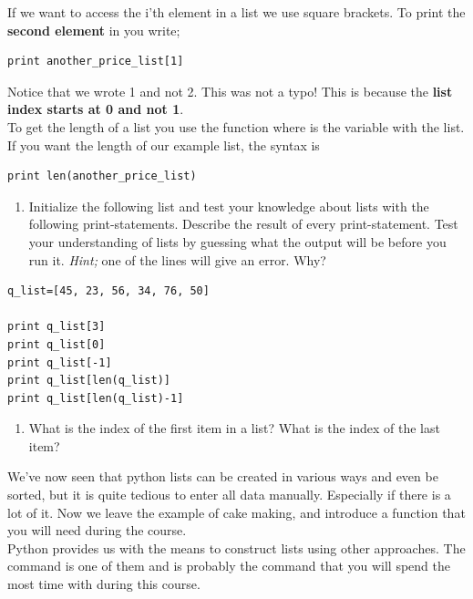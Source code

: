 \documentclass{article}
\begin{document}
If we want to access the i'th element in a list
we use square brackets. To print the \textbf{second element}
in  you write;

\begin{lstlisting}
print another_price_list[1]
\end{lstlisting}

Notice that we wrote 1 and not 2. This was not a typo!
This is because the {\bf{list index starts at 0 and not 1}}.\\

To get the length of a list you use the function 
where  is the variable with the list.
If you want the length of our example list, the syntax is

\begin{lstlisting}
print len(another_price_list)
\end{lstlisting}

\begin{enumerate}[resume]
  \item Initialize the following list and test your knowledge about
    lists with the following print-statements.
    Describe the result of every print-statement. Test your
    understanding of lists by guessing what the output will be before
    you run it. 
    {\em Hint;} one of the lines will give an error. Why? \label{list operations}
\end{enumerate} 
\begin{lstlisting}
q_list=[45, 23, 56, 34, 76, 50]

print q_list[3]
print q_list[0]
print q_list[-1]
print q_list[len(q_list)]
print q_list[len(q_list)-1]
\end{lstlisting}

\begin{enumerate}[resume]
  \item What is the index of the first item in a list? What is the index of
    the last item?

\end{enumerate}

We've now seen that python lists can be created in various ways and even be
sorted, but it is quite tedious to enter all data manually. Especially if
there is a lot of it. Now we leave the example of cake making, and introduce a function that you will need during the course. \\

Python provides us with the means to construct
lists using other approaches.
The  command is one of them and is probably the
command that you will spend the most time with during this course.
\end{document}
